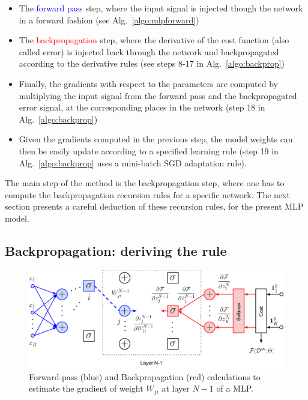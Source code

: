 \begin{itemize}
\item The \textcolor{blue}{forward pass} step, where the input signal is injected though the network  in a forward fashion (see Alg.~\ref{algo:mlpforward})
\item The \textcolor{red}{backpropagation} step, where the derivative of the cost function (also called error) is injected back through the network and backpropagated according to the derivative rules (see steps 8-17 in Alg.~\ref{algo:backprop})
\item Finally, the gradients with respect to the parameters are computed by multiplying the input signal from the forward pass and the backpropagated error signal, at the corresponding places in the network (step 18 in Alg.~\ref{algo:backprop})
\item Given the gradients computed in the previous step, the model weights can then be easily update according to a specified learning rule (step 19 in Alg.~\ref{algo:backprop} uses a mini-batch SGD adaptation rule).
\end{itemize}

The main step of the method is the backpropagation step, where one has to compute the backpropagation recursion rules for a specific network.
The next section presents a careful deduction of these recursion rules, for the present MLP model. 


\subsection{Backpropagation: deriving the rule}

\begin{figure}[!h]
\centering
\includegraphics[scale=0.6]{figs/deep_learning/NN_backprop_colored.pdf}
\caption{Forward-pass (blue) and Backpropagation (red) calculations to estimate the gradient of weight $W_{ji}$ at layer $N-1$ of a MLP.}
\label{fig:NN_color}
\end{figure}

